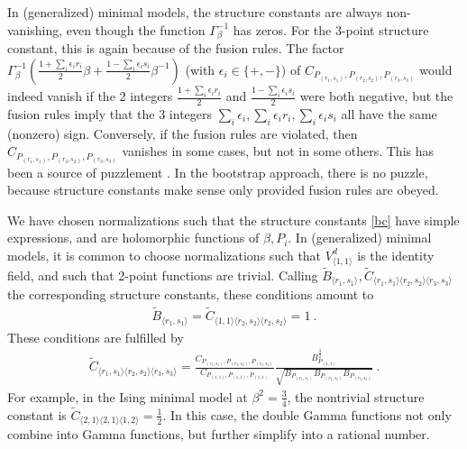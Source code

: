 \documentclass[12pt, a4paper]{article}
\theoremstyle{break}
\begin{document}
In (generalized) minimal models, the structure constants are always non-vanishing, even though the function $\Gamma_\beta^{-1}$ has zeros. For the 3-point structure constant, this is again because of the fusion rules. 
The factor $\Gamma_\beta^{-1}\left(\frac{1+\sum_i\epsilon_ir_i}{2}\beta + \frac{1-\sum_i \epsilon_is_i}{2}\beta^{-1}\right)$ (with $\epsilon_i\in \{+,-\}$) of $C_{P_{(r_1,s_1)},P_{(r_2,s_2)},P_{(r_3,s_3)}}$ would indeed vanish if the 2 integers $\frac{1+\sum_i\epsilon_ir_i}{2}$ and $\frac{1-\sum_i \epsilon_is_i}{2}$ were both negative, but the fusion rules imply that the 3 integers $\sum_i\epsilon_i,\sum_i\epsilon_ir_i,\sum_i\epsilon_is_i$ all have the same (nonzero) sign. Conversely, if the fusion rules are violated, then $C_{P_{(r_1,s_1)},P_{(r_2,s_2)},P_{(r_3,s_3)}}$ vanishes in some cases, but not in some others. This has been a source of puzzlement \cite{zam05}. In the bootstrap approach, there is no puzzle, because structure constants make sense only provided fusion rules are obeyed. 

We have chosen normalizations such that the structure constants \eqref{bc} have simple expressions, and are holomorphic functions of $\beta,P_i$. In (generalized) minimal models, it is common to choose normalizations such that $V^d_{\langle 1,1\rangle}$ is the identity field, and such that 2-point functions are trivial. Calling $\widetilde{B}_{\langle r_1,s_1\rangle},\widetilde{C}_{\langle r_1,s_1\rangle\langle r_2,s_2\rangle \langle r_3,s_3\rangle}$ the corresponding structure constants, these conditions amount to 
\begin{align}
 \widetilde{B}_{\langle r_1,s_1\rangle} = \widetilde{C}_{\langle 1,1\rangle\langle r_2,s_2\rangle \langle r_2,s_2\rangle} = 1\ .
\end{align}
These conditions are fulfilled by 
\begin{align}
 \widetilde{C}_{\langle r_1,s_1\rangle\langle r_2,s_2\rangle \langle r_3,s_3\rangle} 
 = \frac{C_{P_{(r_1,s_1)},P_{(r_2,s_2)},P_{(r_3,s_3)}}}{C_{P_{(1,1)},P_{(1,1)},P_{(1,1)}}}
 \frac{B_{P_{(1,1)}}^\frac32}
 {\sqrt{B_{P_{(r_1,s_1)}}B_{P_{(r_2,s_2)}} B_{P_{(r_3,s_3)}}}}\ .
 \label{wtc}
\end{align}
For example, in the Ising minimal model at $\beta^2=\frac34$, the nontrivial structure constant is $\widetilde{C}_{\langle 2,1\rangle\langle 2,1\rangle\langle 1,2\rangle}=\frac12$. In this case, the double Gamma functions not only combine into Gamma functions, but further simplify into a rational number. 
\end{document}
